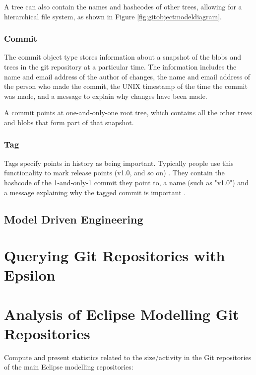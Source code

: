 \documentclass[runningheads,a4paper]{llncs}
\begin{document}
A tree can also contain the names and hashcodes of other trees, allowing for a hierarchical file system, as shown in Figure \ref{fig:gitobjectmodeldiagram}. 

\subsubsection{Commit}
The commit object type stores information about a snapshot of the blobs and trees in the git repository at a particular time. The information includes the name and email address of the author of changes, the name and email address of the person who made the commit, the UNIX timestamp of the time the commit was made, and a message to explain why changes have been made.

A commit points at one-and-only-one root tree, which contains all the other trees and blobs that form part of that snapshot.

\subsubsection{Tag}
Tags specify points in history as being important. Typically people use this functionality to mark release points (v1.0, and so on) \cite{gitdocstags}. They contain the hashcode of the 1-and-only-1 commit they point to, a name (such as "v1.0") and a message explaining why the tagged commit is important \cite{gitforcomputerscientists}.

\subsection{Model Driven Engineering}


\section{Querying Git Repositories with Epsilon}

\section{Analysis of Eclipse Modelling Git Repositories}
Compute and present statistics related to the size/activity in the Git repositories of the main Eclipse modelling repositories:
\end{document}
